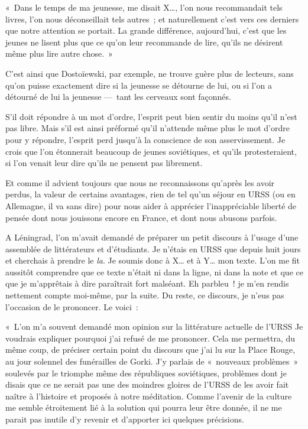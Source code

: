 \documentclass[french,twoside]{book} %
\begin{document}
« Dans le temps de ma jeunesse, me disait X…, l’on nous recommandait tels livres, l’on nous déconseillait tels autres ; et naturellement c’est vers ces derniers que notre attention se portait. La grande différence, aujourd’hui, c’est que les jeunes ne lisent plus que ce qu’on leur recommande de lire, qu’ils ne désirent même plus lire autre chose. »\par
C’est ainsi que Dostoïewski, par exemple, ne trouve guère plus de lecteurs, sans qu’on puisse exactement dire si la jeunesse se détourne de lui, ou si l’on a détourné de lui la jeunesse — tant les cerveaux sont façonnés.\par
S’il doit répondre à un mot d’ordre, l’esprit peut bien sentir du moins qu’il n’est pas libre. Mais s’il est ainsi préformé qu’il n’attende même plus le mot d’ordre pour y répondre, l’esprit perd jusqu’à la conscience de son asservissement. Je crois que l’on étonnerait beaucoup de jeunes soviétiques, et qu’ils protesteraient, si l’on venait leur dire qu’ils ne pensent pas librement.\par
Et comme il advient toujours que nous ne reconnaissons qu’après les avoir perdus, la valeur de certains avantages, rien de tel qu’un séjour en URSS (ou en Allemagne, il va sans dire) pour nous aider à apprécier l’inappréciable liberté de pensée dont nous jouissons encore en France, et dont nous abusons parfois.\par
A Léningrad, l’on m’avait demandé de préparer un petit discours à l’usage d’une assemblée de littérateurs et d’étudiants. Je n’étais en URSS que depuis huit jours et cherchais à prendre le \emph{la}. Je soumis donc à X… et à Y… mon texte. L’on me fit aussitôt comprendre que ce texte n’était ni dans la ligne, ni dans la note et que ce que je m’apprêtais à dire paraîtrait fort malséant. Eh parbleu ! je m’en rendis nettement compte moi-même, par la suite. Du reste, ce discours, je n’eus pas l’occasion de le prononcer. Le voici :\par
« L’on m’a souvent demandé mon opinion sur la littérature actuelle de l’URSS Je voudrais expliquer pourquoi j’ai refusé de me prononcer. Cela me permettra, du même coup, de préciser certain point du discours que j’ai lu sur la Place Rouge, au jour solennel des funérailles de Gorki. J’y parlais de « nouveaux problèmes » soulevés par le triomphe même des républiques soviétiques, problèmes dont je disais que ce ne serait pas une des moindres gloires de l’URSS de les avoir fait naître à l’histoire et proposés à notre méditation. Comme l’avenir de la culture me semble étroitement lié à la solution qui pourra leur être donnée, il ne me parait pas inutile d’y revenir et d’apporter ici quelques précisions.\par
\end{document}

